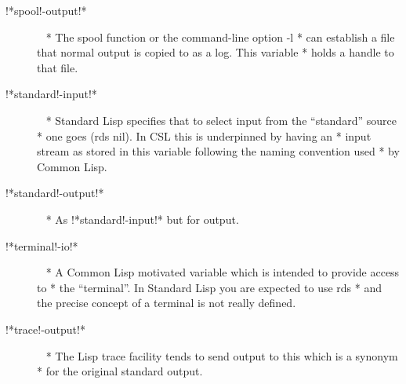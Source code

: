 \documentclass[a4paper,11pt]{article}
\begin{document}
\begin{description}
\item [{\ttfamily !*spool!-output!*}]  ~\newline
  * The {\ttfamily spool} function or the command-line option {\ttfamily -l}
  * can establish a file that normal output is copied to as a log. This variable
  * holds a handle to that file.

\item [{\ttfamily !*standard!-input!*}]  ~\newline
  * Standard Lisp specifies that to select input from the ``standard'' source
  * one goes {\ttfamily (rds nil)}. In CSL this is underpinned by having an
  * input stream as stored in this variable following the naming convention used
  * by Common Lisp.

\item [{\ttfamily !*standard!-output!*}]  ~\newline
  * As {\ttfamily !*standard!-input!*} but for output.

\item [{\ttfamily !*terminal!-io!*}]  ~\newline
  * A Common Lisp motivated variable which is intended to provide access to
  * the ``terminal''. In Standard Lisp you are expected to use {\ttfamily rds}
  * and the precise concept of a terminal is not really defined.

\item [{\ttfamily !*trace!-output!*}]  ~\newline
  * The Lisp trace facility tends to send output to this which is a synonym
  * for the original standard output.


\end{description}
\end{document}
